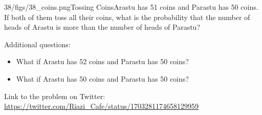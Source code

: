 \begin{problem}{38/figs/38_coins.png}{Tossing Coins}Arastu has 51 coins and Parastu has 50 coins. If both of them toss all their coins, what is the probability that the number of heads of Arastu  is more than the number of heads of Parastu?

Additional questions:
\begin{itemize}
\item What if Arastu has 52 coins and  Parastu has 50 coins?
\item What if Arastu has 50 coins and  Parastu has 50 coins?
\end{itemize}

Link to the problem on Twitter:  \url{https://twitter.com/Riazi_Cafe/status/1703281174658129959}\end{problem}